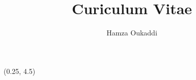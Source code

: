 \documentclass[a4paper]{hamza-cv}
\title{Curiculum Vitae}
\author{Hamza Oukaddi}
\begin{document}
\makeprofile %

\begin{textblock}{20.5}(0.25, 4.5)

  \begin{minipage}[t]{0.37\textwidth}





    

\end{minipage}
\end{textblock}
\end{document}
